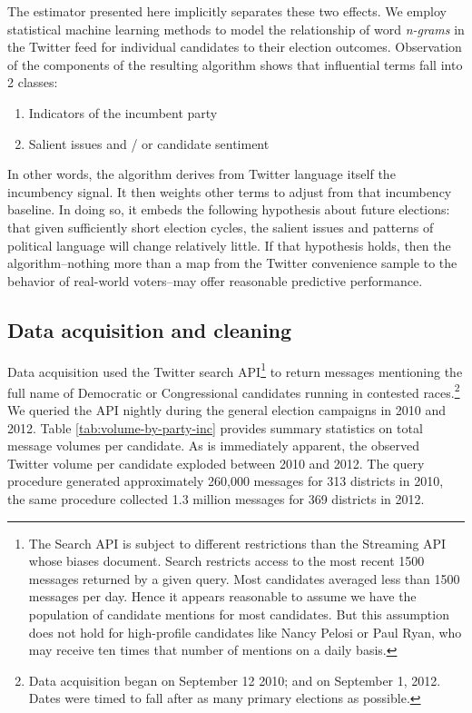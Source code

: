 \documentclass{article}
\begin{document}
The estimator presented here implicitly separates these two
effects. We employ statistical machine learning methods to model the
relationship of word \textit{n-grams} in the Twitter feed for
individual candidates to their election outcomes. Observation of the
components of the resulting algorithm shows that influential terms
fall into 2 classes:

\begin{enumerate}
\item Indicators of the incumbent party
\item Salient issues and / or candidate sentiment
\end{enumerate}

In other words, the algorithm derives from Twitter language itself the
incumbency signal. It then weights other terms to adjust from that
incumbency baseline. In doing so, it embeds the following hypothesis
about future elections: that given sufficiently short election cycles,
the salient issues and patterns of political language will change
relatively little. If that hypothesis holds, then the
algorithm--nothing more than a map from the Twitter convenience sample
to the behavior of real-world voters--may offer reasonable predictive
performance.

\subsection{Data acquisition and cleaning}
\label{sec:data-acquisition}

Data acquisition used the Twitter search API\footnote{The Search API
  is subject to different restrictions than the Streaming API whose
  biases \cite{morstatter2013sample} document. Search restricts access
to the most recent 1500 messages returned by a given query. Most
candidates averaged less than 1500 messages per day. Hence it appears
reasonable to assume we have the population of candidate mentions for
most candidates. But this assumption does not hold for high-profile
candidates like Nancy Pelosi or Paul Ryan, who may receive ten times
that number of mentions on a daily basis.} to return messages
mentioning the full name of Democratic or Congressional candidates
running in contested races.\footnote{Data acquisition began on September 12
2010; and on September 1, 2012. Dates were timed to fall after as many
primary elections as possible.} We queried the API nightly during the
general election campaigns in 2010 and 2012. Table
\ref{tab:volume-by-party-inc} provides summary statistics on total
message volumes per candidate. As is immediately apparent, the observed
Twitter volume per candidate exploded between 2010 and 2012. The query
procedure generated approximately 260,000 messages for 313 districts
in 2010, the same procedure collected 1.3 million messages for 369
districts in 2012.  %
\end{document}
